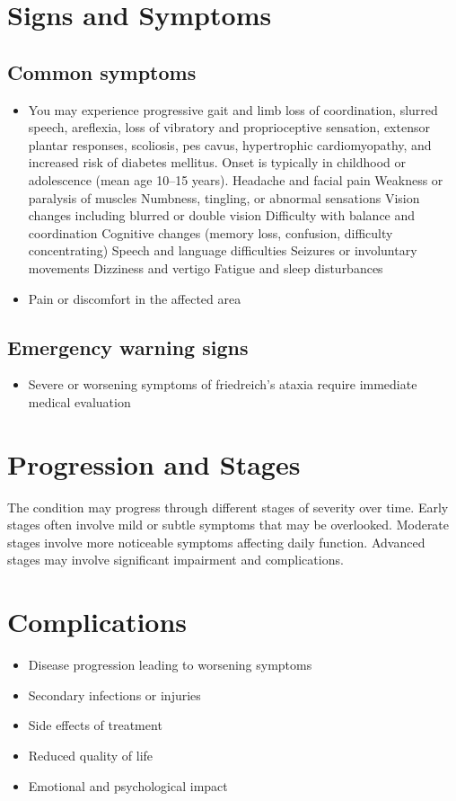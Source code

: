 \section{Signs and Symptoms}
\subsection{Common symptoms}
\begin{itemize}[noitemsep]
  \item You may experience progressive gait and limb loss of coordination, slurred speech, areflexia, loss of vibratory and proprioceptive sensation, extensor plantar responses, scoliosis, pes cavus, hypertrophic cardiomyopathy, and increased risk of diabetes mellitus. Onset is typically in childhood or adolescence (mean age 10--15 years). Headache and facial pain Weakness or paralysis of muscles Numbness, tingling, or abnormal sensations Vision changes including blurred or double vision Difficulty with balance and coordination Cognitive changes (memory loss, confusion, difficulty concentrating) Speech and language difficulties Seizures or involuntary movements Dizziness and vertigo Fatigue and sleep disturbances
  \item Pain or discomfort in the affected area
  \end{itemize}
\subsection{Emergency warning signs}
\begin{itemize}[noitemsep]
  \item Severe or worsening symptoms of friedreich's ataxia require immediate medical evaluation
\end{itemize}
\section{Progression and Stages}
The condition may progress through different stages of severity over time. Early stages often involve mild or subtle symptoms that may be overlooked. Moderate stages involve more noticeable symptoms affecting daily function. Advanced stages may involve significant impairment and complications.
\section{Complications}
\begin{itemize}[noitemsep]
  \item Disease progression leading to worsening symptoms
  \item Secondary infections or injuries
  \item Side effects of treatment
  \item Reduced quality of life
  \item Emotional and psychological impact
\end{itemize}
